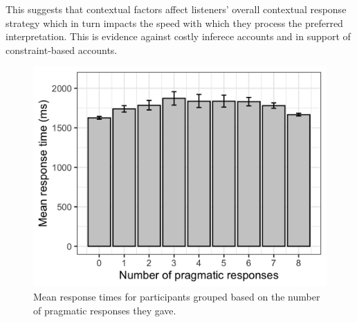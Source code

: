 \documentclass[10pt,letterpaper]{article}
\begin{document}
This suggests that contextual factors affect listeners' overall contextual response strategy which in turn impacts the speed with which they process the preferred interpretation. This is evidence against costly inferece accounts and in support of constraint-based accounts.

\begin{figure}
  \includegraphics[width=\columnwidth]{plots/consistency.png}
  \caption{Mean response times for participants grouped based on the number of pragmatic responses they gave. \label{fig:consistency}}
\end{figure}

%
%




\setlength{\bibleftmargin}{.125in}
\setlength{\bibindent}{-\bibleftmargin}


\end{document}
